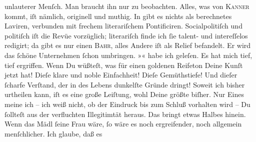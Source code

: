 \begin{ledgroupsized}[t]{13cm}
                  \strikeout{\textcolor{gray}{m}}{ } unlauterer Menſch. Man braucht ihn nur \label{K_L02616-10v}\label{K_L02616-10h} zu beobachten. Alles,
               was von \textsc{Kanner} kommt, iſt nämlich, originell und muthig. In \label{K_L02616-11v}\label{K_L02616-11h} gibt es nichts als berechnetes Laviren, verbunden mit
               frechem literariſchem Pontificiren. Socialpolitiſch und politiſch iſt die Revüe vorzüglich; literariſch
               finde ich ſie talent- und  intereſſelos redigirt;
               da gibt es nur einen \textsc{Bahr},  alles Andere iſt als Relief befandelt. Er wird das ſchöne Unternehmen ſchon umbringen.\pend
           \pstart
           »\label{K_L02616-12v}\label{K_L02616-12h}« habe ich geleſen. Es hat mich tief,
               tief ergriffen. Wenn Du wüßteſt, was für einen goldenen Reifeton Deine Kunſt jetzt
               hat! Dieſe klare und noble Einfachheit! Dieſe Gemüthstiefe! Und dieſer ſcharfe
               Verſtand, der in des Lebens dunkelſte Gründe dringt! Soweit ich bisher urtheilen
               kann, iſt es eine große Leiſtung, wohl Deine größte biſher. Nur Eines meine ich – ich
               weiß nicht, ob der Eindruck bis zum Schluß vorhalten wird – Du ſollteſt aus der
               verfluchten Illegitimtät heraus. Das bringt etwas {\pb}Halbes hinein. Wenn das Mädl ſeine Frau wäre, ſo \strikeout{\textcolor{gray}{×}} wäre es noch ergreifender, noch allgemein menſchlicher. Ich glaube, daß es

\end{ledgroupsized}
